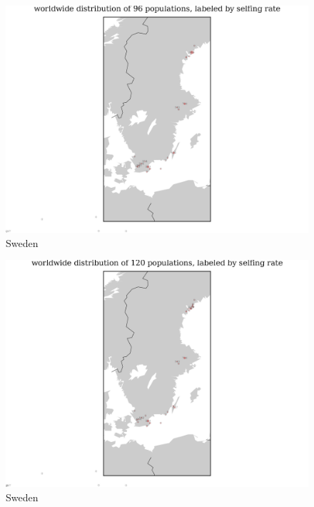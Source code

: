 \documentclass[a4paper,10pt]{article}
\begin{document}
\begin{figure}
\includegraphics[width=1\textwidth]{figures/s0829popid2ecotypeid_10_Swe_10_52_20_65_l3y1_pop_map.png}
\caption{Sweden}\label{f20}
\end{figure}

\begin{figure}
\includegraphics[width=1\textwidth]{figures/s0829popid2ecotypeid_5_Swe_10_52_20_65_l3y1_pop_map.png}
\caption{Sweden}\label{f19}
\end{figure}




\end{document}
